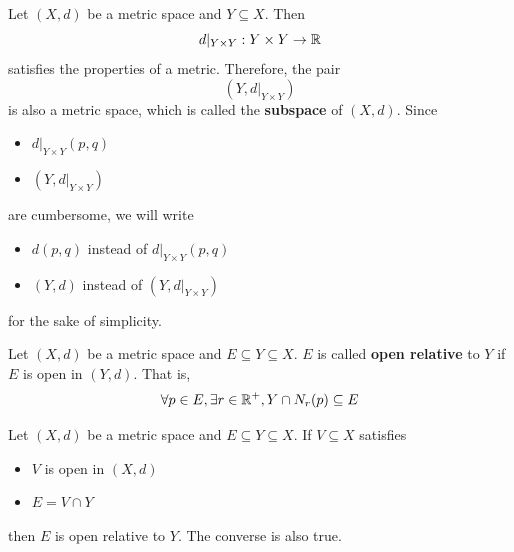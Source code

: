 \begin{remark}
    Let $(X, d)$ be a metric space and $Y \subseteq X$. Then
    \[
    d|_{Y \times Y}: Y \times Y \to \mathbb{R}
    \]
    satisfies the properties of a metric. Therefore, the pair
    \[
    (Y, d|_{Y \times Y})
    \]
    is also a metric space, which is called the \textbf{subspace} of $(X, d)$. Since
    \begin{itemize}
        \item $d|_{Y \times Y}(p, q)$
        \item $(Y, d|_{Y \times Y})$
    \end{itemize}
    are cumbersome, we will write
    \begin{itemize}
        \item $d(p, q)$ instead of $d|_{Y \times Y}(p, q)$
        \item $(Y, d)$ instead of $(Y, d|_{Y \times Y})$
    \end{itemize}
    for the sake of simplicity.
\end{remark}

\bigskip

\begin{definition} \label{an:def:open-set-relative-to-subspace}
    Let $(X, d)$ be a metric space and $E \subseteq Y \subseteq X$. $E$ is called
    \textbf{open relative} to $Y$ if $E$ is open in $(Y, d)$. That is,
    \[
    \forall p \in E, \exists r \in \mathbb{R}^{+},Y \cap N_{r}(p) \subseteq E
    \]
\end{definition}

\bigskip

\begin{theorem} \label{an:thm:open-set-relative-to-subspace}
    Let $(X, d)$ be a metric space and $E \subseteq Y \subseteq X$. If $V \subseteq X$ satisfies
    \begin{itemize}
        \item $V$ is open in $(X, d)$
        \item $E = V \cap Y$
    \end{itemize}
    then $E$ is open relative to $Y$. The converse is also true.
\end{theorem}

